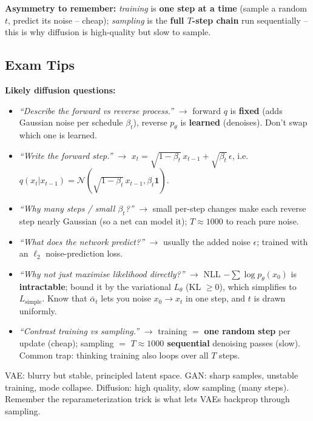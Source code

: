 \documentclass[10pt,a4paper]{article}
\begin{document}
	\begin{importantbox}
		\textbf{Asymmetry to remember:} \emph{training} is \textbf{one step at a time} (sample a random $t$, predict its noise -- cheap); \emph{sampling} is the \textbf{full $T$-step chain} run sequentially -- this is why diffusion is high-quality but slow to sample.
	\end{importantbox}

	\subsection{Exam Tips}

	\begin{examtipbox}
		\textbf{Likely diffusion questions:}
		\begin{itemize}
			\item \emph{``Describe the forward vs reverse process.''} $\to$ forward $q$ is \textbf{fixed} (adds Gaussian noise per schedule $\beta_t$), reverse $p_\theta$ is \textbf{learned} (denoises). Don't swap which one is learned.
			\item \emph{``Write the forward step.''} $\to$ $x_t=\sqrt{1-\beta_t}\,x_{t-1}+\sqrt{\beta_t}\,\epsilon$, i.e.\ $q(x_t|x_{t-1})=\mathcal{N}(\sqrt{1-\beta_t}\,x_{t-1},\beta_t\mathbf{1})$.
			\item \emph{``Why many steps / small $\beta_t$?''} $\to$ small per-step changes make each reverse step nearly Gaussian (so a net can model it); $T\approx1000$ to reach pure noise.
			\item \emph{``What does the network predict?''} $\to$ usually the added noise $\epsilon$; trained with an $\ell_2$ noise-prediction loss.
			\item \emph{``Why not just maximise likelihood directly?''} $\to$ NLL $-\sum\log p_\theta(x_0)$ is \textbf{intractable}; bound it by the variational $L_\theta$ (KL $\ge0$), which simplifies to $L_{\text{simple}}$. Know that $\bar\alpha_t$ lets you noise $x_0\to x_t$ in one step, and $t$ is drawn uniformly.
			\item \emph{``Contrast training vs sampling.''} $\to$ training $=$ \textbf{one random step} per update (cheap); sampling $=$ \textbf{$T\approx1000$ sequential} denoising passes (slow). Common trap: thinking training also loops over all $T$ steps.
		\end{itemize}
	\end{examtipbox}
	
	\begin{examtipbox}
		VAE: blurry but stable, principled latent space. GAN: sharp samples, unstable training, mode collapse. Diffusion: high quality, slow sampling (many steps). Remember the reparameterization trick is what lets VAEs backprop through sampling.
	\end{examtipbox}
\end{document}
